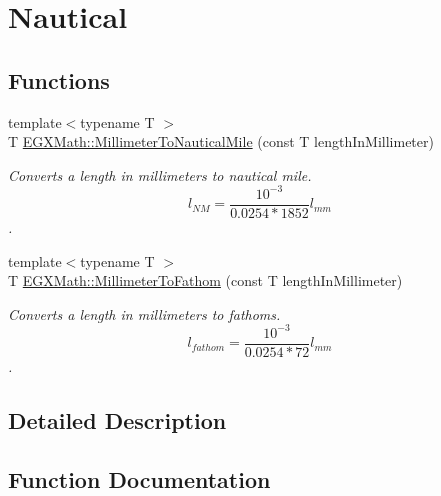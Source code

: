 \hypertarget{group___e_g_x_math-_conversions-_length_conversions-_millimeter-_nautical}{}\section{Nautical}
\label{group___e_g_x_math-_conversions-_length_conversions-_millimeter-_nautical}
\subsection*{Functions}
\begin{DoxyCompactItemize}
\item 
{\footnotesize template$<$typename T $>$ }\\T \mbox{\hyperlink{group___e_g_x_math-_conversions-_length_conversions-_millimeter-_nautical_ga05ed5fb1300287763d8927ee90315808}{E\+G\+X\+Math\+::\+Millimeter\+To\+Nautical\+Mile}} (const T length\+In\+Millimeter)
\begin{DoxyCompactList}\small\item\em Converts a length in millimeters to nautical mile. \[ l_{NM}= \frac{10^{-3}}{0.0254 * 1852} l_{mm} \]. \end{DoxyCompactList}\item 
{\footnotesize template$<$typename T $>$ }\\T \mbox{\hyperlink{group___e_g_x_math-_conversions-_length_conversions-_millimeter-_nautical_ga1dce4ee3123e0132aae95bc9f7d0ac31}{E\+G\+X\+Math\+::\+Millimeter\+To\+Fathom}} (const T length\+In\+Millimeter)
\begin{DoxyCompactList}\small\item\em Converts a length in millimeters to fathoms. \[ l_{fathom}= \frac{10^{-3}}{0.0254 * 72} l_{mm} \]. \end{DoxyCompactList}\end{DoxyCompactItemize}


\subsection{Detailed Description}


\subsection{Function Documentation}
\mbox{\label{group___e_g_x_math-_conversions-_length_conversions-_millimeter-_nautical_ga1dce4ee3123e0132aae95bc9f7d0ac31}} 

